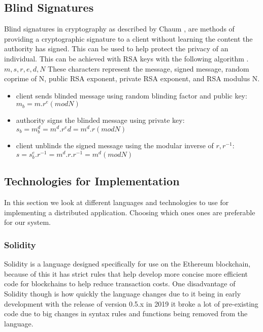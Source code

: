 \documentclass{entcs}
\begin{document}

\subsection{Blind Signatures}
Blind signatures in cryptography as described by Chaum \cite{chaum1983blind}, are methods of providing a cryptographic signature to a client without learning the content the authority has signed. This can be used to help protect the privacy of an individual. This can be achieved with RSA keys with the following algorithm \cite{MITcrypto}.
\(m, s, r, e, d, N\) These characters represent the message, signed message, random coprime of N, public RSA exponent, private RSA exponent, and RSA modulus N.
\begin{itemize}
    \item client sends blinded message using random blinding factor and public key: \\
    \(m_b = m.r^e (mod N)\)
    \item authority signs the blinded message using private key: \\
    \(s_b = m^d_b = m^d.r^ed = m^d.r (mod N)\)
    \item client unblinds the signed message using the modular inverse of \(r, r^{-1}\): \\
    \(s = s^e_b.r^{-1} = m^d.r.r^{-1} = m^d (mod N)\)
\end{itemize}

\subsection{Technologies for Implementation}
In this section we look at different languages and technologies to use for implementing a distributed application. Choosing which ones ones are preferable for our system.


\subsubsection{Solidity}
Solidity is a language designed specifically for use on the Ethereum blockchain, because of this it has strict rules that help develop more concise more efficient code for blockchains to help reduce transaction costs. One disadvantage of Solidity though is how quickly the language changes due to it being in early development with the release of version 0.5.x in 2019 it broke a lot of pre-existing code due to big changes in syntax rules and functions being removed from the language.
\end{document}
